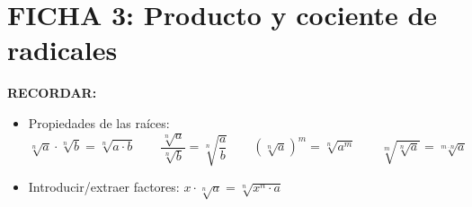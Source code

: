 \documentclass[10pt, a4paper]{article}
\newenvironment{boxsummary}{%
  \def\FrameCommand{\fcolorbox{black}{graybox}}%
  \MakeFramed{\FrameRestore}%
  \small\textbf{RECORDAR:}\par\smallskip
}{%
  \endMakeFramed
}
\begin{document}
\newpage

\section*{FICHA 3: Producto y cociente de radicales}

\begin{boxsummary}
\begin{itemize}[leftmargin=*, itemsep=2pt]
    \item Propiedades de las raíces:
    \[ \sqrt[n]{a} \cdot \sqrt[n]{b} = \sqrt[n]{a \cdot b} \qquad \frac{\sqrt[n]{a}}{\sqrt[n]{b}} = \sqrt[n]{\frac{a}{b}} \qquad (\sqrt[n]{a})^m = \sqrt[n]{a^m} \qquad \sqrt[m]{\sqrt[n]{a}} = \sqrt[m \cdot n]{a} \]
    \item Introducir/extraer factores: $x \cdot \sqrt[n]{a} = \sqrt[n]{x^n \cdot a}$
\end{itemize}
\end{boxsummary}
\end{document}
